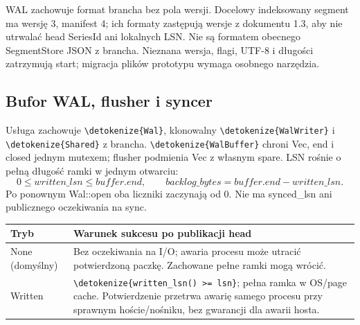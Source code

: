 \documentclass[11pt,a4paper]{article}
\newcommand{\code}[1]{\expandafter\nolinkurl\expandafter{\detokenize{#1}}}
\begin{document}
WAL zachowuje format brancha bez pola wersji. Docelowy indeksowany
segment ma wersję 3, manifest 4; ich formaty zastępują wersje z dokumentu
1.3, aby nie utrwalać head SeriesId ani lokalnych LSN.
Nie są formatem obecnego SegmentStore JSON z brancha.
Nieznana wersja, flagi, UTF-8 i długości zatrzymują start;
migracja plików prototypu wymaga osobnego narzędzia.

\subsection{Bufor WAL, flusher i syncer}
\label{sec:wal-runtime}
Usługa zachowuje \code{Wal}, klonowalny \code{WalWriter} i
\code{Shared} z brancha. \code{WalBuffer} chroni Vec, end i closed
jednym mutexem; flusher podmienia Vec z własnym spare.
LSN rośnie o pełną długość ramki w jednym otwarciu:
\[
 0\leq written\_lsn\leq buffer.end,\qquad
 backlog\_bytes=buffer.end-written\_lsn.
\]
Po ponownym Wal::open oba liczniki zaczynają od 0. Nie ma
synced\_lsn ani publicznego oczekiwania na sync.

\begin{tabularx}{\linewidth}{P{23mm}Y}
\toprule
Tryb & Warunek sukcesu po publikacji head\\ \midrule
None (domyślny) & Bez oczekiwania na I/O; awaria procesu może utracić
potwierdzoną paczkę. Zachowane pełne ramki mogą wrócić.\\
Written & \code{written_lsn() >= lsn}; pełna ramka w OS/page cache.
Potwierdzenie przetrwa awarię samego procesu przy sprawnym hoście/nośniku,
bez gwarancji dla awarii hosta.\\
\bottomrule
\end{tabularx}
\par
\end{document}
